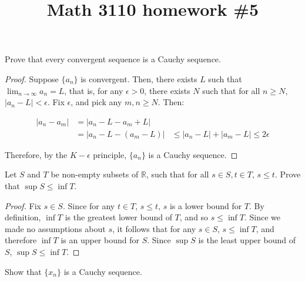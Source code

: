 

\title{Math 3110 homework \#5}
\author{\name}
\maketitle

Prove that every convergent sequence is a Cauchy sequence.

\begin{proof}
  Suppose $\{a_n\}$ is convergent. Then, there exists $L$ such that $\lim_{n \rightarrow \infty} a_n = L$, that is, for any $\epsilon > 0$, there exists $N$ such that for all $n \geq N$, $|a_n - L| < \epsilon$. Fix $\epsilon$, and pick any $m, n \geq N$. Then:

  \begin{align*}
    |a_n - a_m| &= |a_n - L - a_m + L| \\
    &= |a_n - L - (a_m - L)|
    &\leq |a_n - L| + |a_m - L| \leq 2\epsilon
  \end{align*}

  Therefore, by the $K-\epsilon$ principle, $\{a_n\}$ is a Cauchy sequence.
\end{proof}

Let $S$ and $T$ be non-empty subsets of $\mathbb{R}$, such that for all $s \in S, t \in T$, $s \leq t$. Prove that $\sup S \leq \inf T$.

\begin{proof}
  Fix $s \in S$. Since for any $t \in T$, $s \leq t$, $s$ is a lower bound for $T$. By definition, $\inf T$ is the greatest lower bound of $T$, and so $s \leq \inf T$. Since we made no assumptions about $s$, it follows that for any $s \in S$, $s \leq \inf T$, and therefore $\inf T$ is an upper bound for $S$. Since $\sup S$ is the least upper bound of $S$, $\sup S \leq \inf T$.
\end{proof}


Show that $\{x_n\}$ is a Cauchy sequence.

